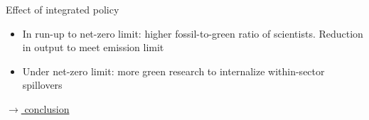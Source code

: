 \documentclass[11pt,aspectratio=169]{beamer}
\begin{document}
\begin{frame}{Effect  of integrated policy}
	\begin{block}{}
		\begin{itemize}
			\item In run-up to net-zero limit: higher fossil-to-green ratio of scientists. Reduction in output to meet emission limit
			\item Under net-zero limit: more green research to internalize within-sector spillovers %
		\end{itemize}
	\end{block}	
	
	\vspace{-5.5mm}
	\hfill
	\hyperlink{conc}{\tiny{$\rightarrow$ conclusion}}
\end{frame}
\end{document}
